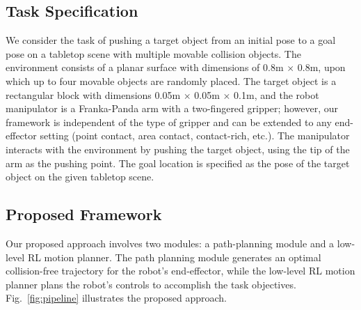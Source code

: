 \subsection{Task Specification}
\label{sec:task-specification}

We consider the task of pushing a target object from an initial pose to a goal pose on a tabletop scene with multiple movable collision objects. The environment consists of a planar surface with dimensions of 0.8m $\times$ 0.8m, upon which up to four movable objects are randomly placed. The target object is a rectangular block with dimensions 0.05m $\times$ 0.05m $\times$ 0.1m, and the robot manipulator is a Franka-Panda arm with a two-fingered gripper; however, our framework is independent of the type of gripper and can be extended to any end-effector setting (point contact, area contact, contact-rich, etc.). The manipulator interacts with the environment by pushing the target object, using the tip of the arm as the pushing point. The goal location is specified as the pose of the target object on the given tabletop scene. 

\subsection{Proposed Framework}

Our proposed approach involves two modules: a path-planning module and a low-level RL motion planner. The path planning module generates an optimal collision-free trajectory for the robot's end-effector, while the low-level RL motion planner plans the robot's controls to accomplish the task objectives. Fig.~\ref{fig:pipeline} illustrates the proposed approach.

